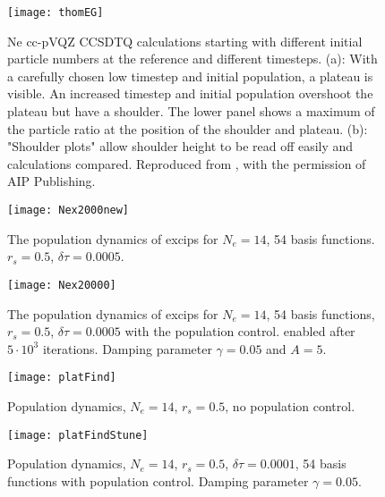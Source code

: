 \begin{figure}[ht!]
	\centering
	\texttt{[image: thomEG]}
	\caption{Ne cc-pVQZ CCSDTQ calculations starting with different initial
		particle numbers at the reference and different timesteps. (a): With a carefully
		chosen low timestep and initial population, a plateau is visible. An increased
		timestep and initial population overshoot the plateau but have a shoulder.
		The lower panel shows a maximum of the particle ratio at the position of
		the shoulder and plateau. (b): "Shoulder plots" allow shoulder height to be
		read off easily and calculations compared. Reproduced from \cite{spencerDevelopmentsStochasticCoupled2016}, with the permission of AIP Publishing. }
	\label{fig:thomEG}
\end{figure}


\begin{figure}[ht!]
	\centering
	\texttt{[image: Nex2000new]}
	\caption{The population dynamics of excips for $N_e=14$, 54 basis functions. $r_s=0.5$, $\delta \tau=0.0005$.}
	\label{fig:nx2k}
\end{figure}




\begin{figure}[ht!]
	\centering
	\texttt{[image: Nex20000]}
	\caption{The population dynamics of excips for $N_e=14$, 54 basis functions, $r_s=0.5$, $\delta \tau=0.0005$ with the population control. enabled after $5\cdot 10^3$ iterations. Damping parameter  $\gamma = 0.05$ and $A=5$.}
	\label{fig:nx20k}
\end{figure}


\begin{landscape}
	\begin{figure}[ht!]
		\centering
		\texttt{[image: platFind]}
		\caption{Population dynamics, $N_e=14$, $r_s=0.5$, no population control.}
		\label{fig:platFind}
	\end{figure}
\end{landscape}

\begin{landscape}
	\begin{figure}[ht!]
		\centering
		\texttt{[image: platFindStune]}
		\caption{Population dynamics, $N_e=14$, $r_s=0.5$, $\delta \tau=0.0001$, 54 basis functions  with population control. Damping parameter $\gamma = 0.05$. }
		\label{fig:platFindStune}
	\end{figure}
	
\end{landscape}


